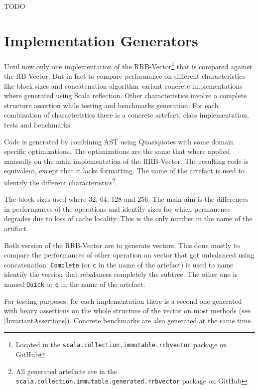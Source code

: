 \color{red} TODO \color{black}

\section{Implementation Generators}
Until now only one implementation of the RRB-Vector\footnote{Located in the \texttt{scala.collection.immutable.rrbvector} package on GitHub} that is compared against the RB-Vector. But in fact to compare performance on different characteristics like block sizes and concatenation algorithm variant concrete implementations where generated using Scala reflection. Other characteristics involve a complete structure assertion while testing and benchmarks generation. For each combination of characteristics there is a concrete artefact: class implementation, tests and benchmarks.

Code is generated by combining AST using Quasiquotes with some domain specific optimizations. The optimizations are the same that where applied manually on the main implementation of the RRB-Vector. The resulting code is equivalent, except that it lacks formatting. The name of the artefact is used to identify the different characteristics\footnote{All generated artefacts are in the \texttt{scala.collection.immutable.generated.rrbvector} package on GitHub}.

The block sizes used where 32, 64, 128 and 256. The main aim is the differences in performances of the operations and identify sizes for which permanence degrades due to loss of cache locality. This is the only number in the name of the artifact.

Both version of the RRB-Vector are to generate vectors. This done mostly to compare the performances of other operation on vector that got unbalanced using concatenation. \texttt{Complete} (or \texttt{c} in the name of the artefact) is used to name identify the version that rebalances completely the subtree. The other one is named \texttt{Quick} or \texttt{q} in the name of the artefact.

For testing purposes, for each implementation there is a second one generated with heavy assertions on the whole structure of the vector on most methods (see \ref{InvariantAssertions}). Concrete benchmarks are also generated at the same time.

